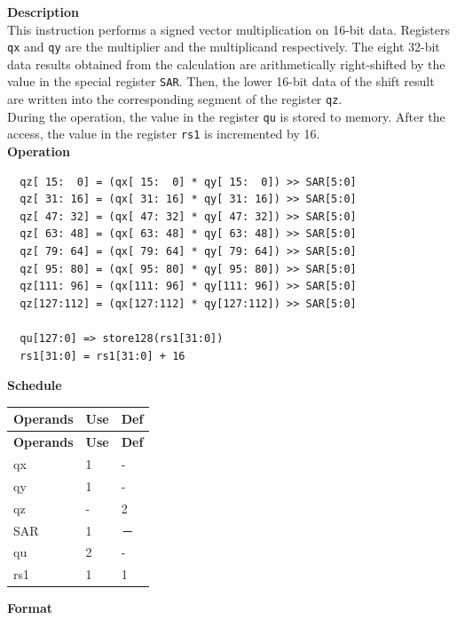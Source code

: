 \textbf{Description}\\
This instruction performs a signed vector multiplication on 16-bit data. Registers \lstinline{qx} and \lstinline{qy} are the multiplier and the multiplicand respectively. The eight 32-bit data results obtained from the calculation are arithmetically right-shifted by the value in the special register \lstinline{SAR}. Then, the lower 16-bit data of the shift result are written into the corresponding segment of the register \lstinline{qz}.
\\During the operation, the value in the register \lstinline{qu} is stored to memory. After the access, the value in the register \lstinline{rs1} is incremented by 16.\\
\textbf{Operation}
\begin{lstlisting}
  qz[ 15:  0] = (qx[ 15:  0] * qy[ 15:  0]) >> SAR[5:0]
  qz[ 31: 16] = (qx[ 31: 16] * qy[ 31: 16]) >> SAR[5:0]
  qz[ 47: 32] = (qx[ 47: 32] * qy[ 47: 32]) >> SAR[5:0]
  qz[ 63: 48] = (qx[ 63: 48] * qy[ 63: 48]) >> SAR[5:0]
  qz[ 79: 64] = (qx[ 79: 64] * qy[ 79: 64]) >> SAR[5:0]
  qz[ 95: 80] = (qx[ 95: 80] * qy[ 95: 80]) >> SAR[5:0]
  qz[111: 96] = (qx[111: 96] * qy[111: 96]) >> SAR[5:0]
  qz[127:112] = (qx[127:112] * qy[127:112]) >> SAR[5:0]

  qu[127:0] => store128(rs1[31:0])
  rs1[31:0] = rs1[31:0] + 16
\end{lstlisting}


\textbf{Schedule}\\
\begin{longtable}[c]{|l|l|l|}
    \hline
    \rowcolor{lightgray}
    \textbf{Operands} & \textbf{Use} & \textbf{Def} \\\hline
    \endfirsthead
    \hline
    \rowcolor{lightgray}
     \textbf{Operands} & \textbf{Use} & \textbf{Def} \\\hline
    \endhead
    \hline
    \endfoot

    qx & 1 & - \\\hline
  qy & 1 & - \\\hline
     qz & - & 2 \\\hline
    SAR & 1 & － \\\hline
    qu & 2 & - \\\hline
    rs1 & 1 & 1

\end{longtable}

\textbf{Format}\\

